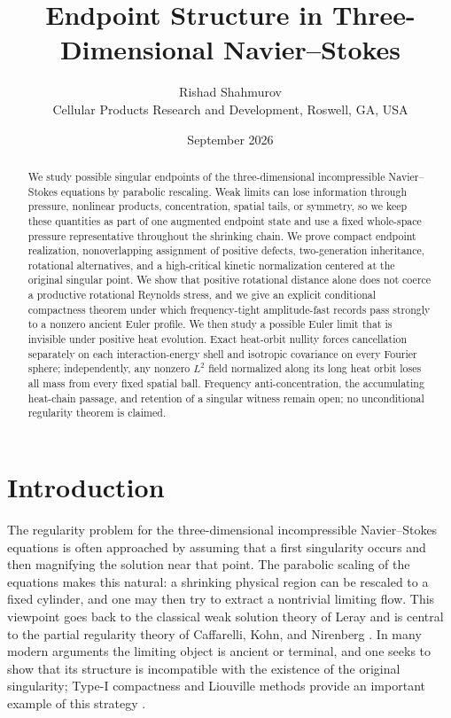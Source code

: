 \documentclass[11pt]{article}
\title{\textbf{Endpoint Structure in Three-Dimensional Navier--Stokes}}
\author{Rishad Shahmurov\\\small Cellular Products Research and Development, Roswell, GA, USA}
\date{September 2026}
\theoremstyle{definition}\newtheorem{problem}[theorem]{Problem}
\theoremstyle{definition}
\theoremstyle{remark}
\begin{document}
\maketitle

\begin{abstract}
We study possible singular endpoints of the three-dimensional incompressible Navier--Stokes equations by parabolic rescaling.  Weak limits can lose information through pressure, nonlinear products, concentration, spatial tails, or symmetry, so we keep these quantities as part of one augmented endpoint state and use a fixed whole-space pressure representative throughout the shrinking chain.  We prove compact endpoint realization, nonoverlapping assignment of positive defects, two-generation inheritance, rotational alternatives, and a high-critical kinetic normalization centered at the original singular point.  We show that positive rotational distance alone does not coerce a productive rotational Reynolds stress, and we give an explicit conditional compactness theorem under which frequency-tight amplitude-fast records pass strongly to a nonzero ancient Euler profile.  We then study a possible Euler limit that is invisible under positive heat evolution.  Exact heat-orbit nullity forces cancellation separately on each interaction-energy shell and isotropic covariance on every Fourier sphere; independently, any nonzero $L^2$ field normalized along its long heat orbit loses all mass from every fixed spatial ball.  Frequency anti-concentration, the accumulating heat-chain passage, and retention of a singular witness remain open; no unconditional regularity theorem is claimed.
\end{abstract}

\section{Introduction}

The regularity problem for the three-dimensional incompressible
Navier--Stokes equations is often approached by assuming that a first
singularity occurs and then magnifying the solution near that point.  The
parabolic scaling of the equations makes this natural: a shrinking physical
region can be rescaled to a fixed cylinder, and one may then try to extract a
nontrivial limiting flow.  This viewpoint goes back to the classical weak
solution theory of Leray \cite{Leray1934} and is central to the partial
regularity theory of Caffarelli, Kohn, and Nirenberg \cite{CKN1982}.  In many
modern arguments the limiting object is ancient or terminal, and one seeks to
show that its structure is incompatible with the existence of the original
singularity; Type-I compactness and Liouville methods provide an important
example of this strategy \cite{AlbrittonBarker2019}.
\end{document}
